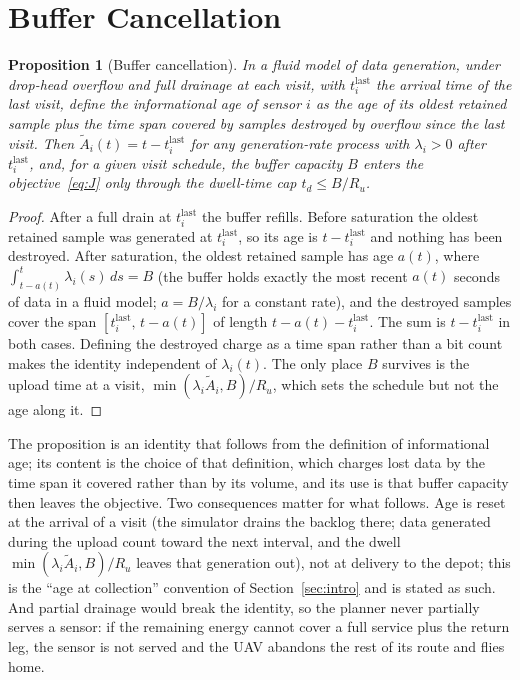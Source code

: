 \documentclass[journal,outdir=./]{IEEEtran}
\newtheorem{proposition}{Proposition}
\newcommand{\Ru}{R_u}
\begin{document}
\section{Buffer Cancellation}\label{sec:buffer}
\begin{proposition}[Buffer cancellation]\label{prop:buffer}
In a fluid model of data generation, under drop-head overflow and full drainage at each visit, with $t^{\mathrm{last}}_i$ the arrival time of the last visit, define the informational age of sensor $i$ as the age of its oldest retained sample plus the time span covered by samples destroyed by overflow since the last visit. Then $\tilde A_i(t)=t-t^{\mathrm{last}}_i$ for any generation-rate process with $\lambda_i>0$ after $t^{\mathrm{last}}_i$, and, for a given visit schedule, the buffer capacity $B$ enters the objective~\eqref{eq:J} only through the dwell-time cap $t_d\le B/\Ru$.
\end{proposition}
\begin{proof}
After a full drain at $t^{\mathrm{last}}_i$ the buffer refills. Before saturation the oldest retained sample was generated at $t^{\mathrm{last}}_i$, so its age is $t-t^{\mathrm{last}}_i$ and nothing has been destroyed. After saturation, the oldest retained sample has age $a(t)$, where $\int_{t-a(t)}^{t}\lambda_i(s)\,ds=B$ (the buffer holds exactly the most recent $a(t)$ seconds of data in a fluid model; $a=B/\lambda_i$ for a constant rate), and the destroyed samples cover the span $[t^{\mathrm{last}}_i,\,t-a(t)]$ of length $t-a(t)-t^{\mathrm{last}}_i$. The sum is $t-t^{\mathrm{last}}_i$ in both cases. Defining the destroyed charge as a time span rather than a bit count makes the identity independent of $\lambda_i(t)$. The only place $B$ survives is the upload time at a visit, $\min(\lambda_i\tilde A_i, B)/\Ru$, which sets the schedule but not the age along it.
\end{proof}

The proposition is an identity that follows from the definition of informational age; its content is the choice of that definition, which charges lost data by the time span it covered rather than by its volume, and its use is that buffer capacity then leaves the objective. Two consequences matter for what follows. Age is reset at the arrival of a visit (the simulator drains the backlog there; data generated during the upload count toward the next interval, and the dwell $\min(\lambda_i\tilde A_i,B)/\Ru$ leaves that generation out), not at delivery to the depot; this is the ``age at collection'' convention of Section~\ref{sec:intro} and is stated as such. And partial drainage would break the identity, so the planner never partially serves a sensor: if the remaining energy cannot cover a full service plus the return leg, the sensor is not served and the UAV abandons the rest of its route and flies home.
\end{document}
